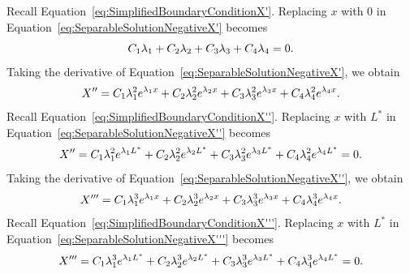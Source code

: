 \documentclass[12pt]{article}
\begin{document}
Recall Equation~\eqref{eq:SimplifiedBoundaryConditionX'}. Replacing $x$ with $0$ in Equation~\eqref{eq:SeparableSolutionNegativeX'} becomes
\begin{equation}\label{eq:SimplifiedSeparableSolutionNegativeX'}
    \centering
    C_1\lambda_1+C_2\lambda_2+C_3\lambda_3+C_4\lambda_4 = 0.
\end{equation}
Taking the derivative of Equation~\eqref{eq:SeparableSolutionNegativeX'}, we obtain
\begin{equation}\label{eq:SeparableSolutionNegativeX''}
    \centering
    X'' = C_1\lambda_1^2e^{\lambda_1x}+C_2\lambda_2^2e^{\lambda_2x}+C_3\lambda_3^2e^{\lambda_3x}+C_4\lambda_4^2e^{\lambda_4x}.
\end{equation}
Recall Equation~\eqref{eq:SimplifiedBoundaryConditionX''}. Replacing $x$ with $L^*$ in Equation~\eqref{eq:SeparableSolutionNegativeX''} becomes
\begin{equation}\label{eq:SimplifiedSeparableSolutionNegativeX''}
    \centering
    X'' = C_1\lambda_1^2e^{\lambda_1L^*}+C_2\lambda_2^2e^{\lambda_2L^*}+C_3\lambda_3^2e^{\lambda_3L^*}+C_4\lambda_4^2e^{\lambda_4L^*} = 0.
\end{equation}
Taking the derivative of Equation~\eqref{eq:SeparableSolutionNegativeX''}, we obtain
\begin{equation}\label{eq:SeparableSolutionNegativeX'''}
    \centering
    X''' = C_1\lambda_1^3e^{\lambda_1x}+C_2\lambda_2^3e^{\lambda_2x}+C_3\lambda_3^3e^{\lambda_3x}+C_4\lambda_4^3e^{\lambda_4x}.
\end{equation}
Recall Equation~\eqref{eq:SimplifiedBoundaryConditionX'''}. Replacing $x$ with $L^*$ in Equation~\eqref{eq:SeparableSolutionNegativeX'''} becomes
\begin{equation}\label{eq:SimplifiedSeparableSolutionNegativeX'''}
    \centering
    X''' = C_1\lambda_1^3e^{\lambda_1L^*}+C_2\lambda_2^3e^{\lambda_2L^*}+C_3\lambda_3^3e^{\lambda_3L^*}+C_4\lambda_4^3e^{\lambda_4L^*} = 0.
\end{equation}
\end{document}
